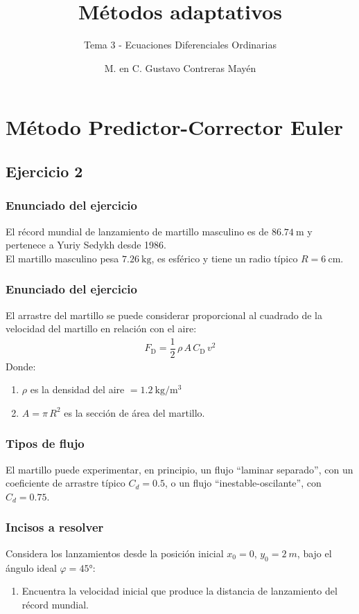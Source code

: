 \documentclass[12pt]{beamer}
\title{\large{Métodos adaptativos}}
\subtitle{Tema 3 - Ecuaciones Diferenciales Ordinarias}
\author{M. en C. Gustavo Contreras Mayén}
\date{}
\begin{document}
\maketitle

\section{Método Predictor-Corrector Euler}
\subsection{Ejercicio 2}

\begin{frame}
\frametitle{Enunciado del ejercicio}
El récord mundial de lanzamiento de martillo masculino es de $\SI{86.74}{\meter}$ y pertenece a Yuriy Sedykh desde 1986.
\\
\bigskip
\pause
El martillo masculino pesa $\SI{7.26}{\kilo\gram}$, es esférico y tiene un radio típico $R = \SI{6}{\centi\meter}$.
\end{frame}
\begin{frame}
\frametitle{Enunciado del ejercicio}
El arrastre del martillo se puede considerar proporcional al cuadrado de la velocidad del martillo en relación con el aire:
\pause
\begin{align*}
F_{\text{D}} = \dfrac{1}{2} \, \rho \, A \, C_{\text{D}} \, v^{2}
\end{align*}
\pause
Donde:
\begin{enumerate}[<+->]
\item $\rho$ es la densidad del aire $= \SI{1.2}{\kilo\gram\per\cubic\meter}$
\item $A = \pi \, R^{2}$ es la sección de área del martillo.
\end{enumerate}
\end{frame}
\begin{frame}
\frametitle{Tipos de flujo}
El martillo puede experimentar, en principio, un flujo \enquote{\textcolor{cerise}{laminar separado}}, con un coeficiente de arrastre típico $C_{d} = 0.5$, \pause o un flujo \enquote{\textcolor{cobalt}{inestable-oscilante}}, con $C_{d} = 0.75$.
\end{frame}
\begin{frame}
\frametitle{Incisos a resolver}
Considera los lanzamientos desde la posición inicial $x_{0} = 0$, $y_{0} = \SI{2}{m}$, bajo el ángulo ideal $\varphi = \ang{45}$:
\pause
{}
\begin{enumerate}[<+->]
\item Encuentra la velocidad inicial que produce la distancia de lanzamiento del récord mundial.
\seti
\end{enumerate}
\end{frame}
\end{document}
